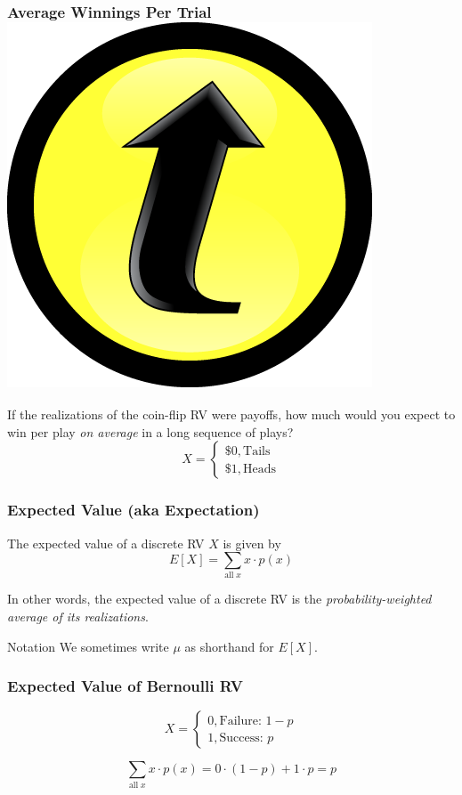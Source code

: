\documentclass[handout]{beamer}
\begin{document}

\begin{frame}
\frametitle{Average Winnings Per Trial \hfill \includegraphics[scale = 0.05]{./images/clicker}}
If the realizations of the coin-flip RV were \alert{payoffs}, how much would you expect to win per play \emph{on average} in a long sequence of plays?
$$X = \left\{ \begin{array}{l}  \$0, \mbox{Tails}\\ \$1, \mbox{Heads}\end{array} \right.$$
\end{frame}
\begin{frame}
\frametitle{Expected Value (aka Expectation)}
The expected value of a discrete RV $X$ is given by
	$$E[X] = \sum_{\mbox{all} \; x} x \cdot p(x)$$

  \vspace{1em}
  \alert{In other words, the expected value of a discrete RV is the \emph{probability-weighted average of its realizations}.}

  \vspace{1em}

  \begin{block}{Notation}
    We sometimes write $\mu$ as shorthand for $E[X]$.  \end{block}
\end{frame}
\begin{frame}
  \frametitle{Expected Value of Bernoulli RV}
$$X = \left\{ \begin{array}{l}  0, \mbox{Failure: } 1-p\\ 1, \mbox{Success: } p\end{array} \right.$$

\vspace{2em}
 
$$\sum_{\mbox{all} \; x} x \cdot p(x) = 0 \cdot (1-p) + 1 \cdot p = p$$
\end{frame}
\end{document}
